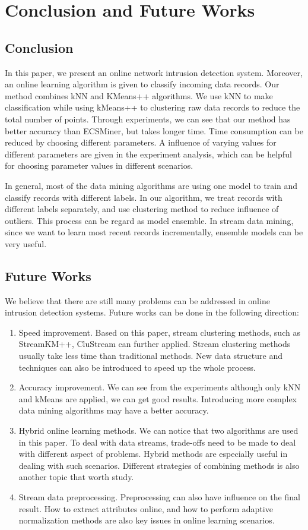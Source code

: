 \documentclass[runningheads]{llncs}
\begin{document}
	\section{Conclusion and Future Works} \label{conclusion}
	
	\subsection{Conclusion}
	In this paper, we present an online network intrusion detection system. Moreover, an online learning algorithm is given to classify incoming data records. Our method combines kNN and KMeans++ algorithms. We use kNN to make classification while using kMeans++ to clustering raw data records to reduce the total number of points. Through experiments, we can see that our method has better accuracy than ECSMiner, but takes longer time. Time consumption can be reduced by choosing different parameters. A influence of varying values for different parameters are given in the experiment analysis, which can be helpful for choosing parameter values in different scenarios.
	
	In general, most of the data mining algorithms are using one model to train and classify records with different labels. In our algorithm, we treat records with different labels separately, and use clustering method to reduce influence of outliers. This process can be regard as model ensemble. In stream data mining, since we want to learn most recent records incrementally, ensemble models can be very useful.
	
	\subsection{Future Works}
	We believe that there are still many problems can be addressed in online intrusion detection systems. Future works can be done in the following direction:
	\begin{enumerate}
		\item Speed improvement. Based on this paper, stream clustering methods, such as StreamKM++\cite{Ackermann2012}, CluStream can further applied. Stream clustering methods usually take less time than traditional methods. New data structure and techniques can also be introduced to speed up the whole process.
		\item Accuracy improvement. We can see from the experiments although only kNN and kMeans are applied, we can get good results. Introducing more complex data mining algorithms may have a better accuracy.
		\item Hybrid online learning methods. We can notice that two algorithms are used in this paper. To deal with data streams, trade-offs need to be made to deal with different aspect of problems. Hybrid methods are especially useful in dealing with such scenarios. Different strategies of combining methods is also another topic that worth study.
		\item Stream data preprocessing. Preprocessing can also have influence on the final result. How to extract attributes online, and how to perform adaptive normalization methods are also key issues in online learning scenarios.
	\end{enumerate}
	
	
	
	  
	
\end{document}
